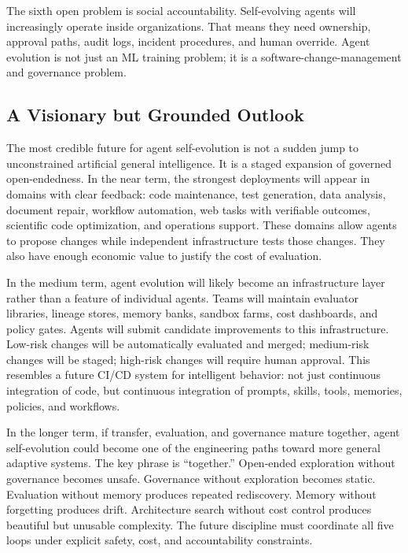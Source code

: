 The sixth open problem is social accountability. Self-evolving agents will increasingly operate inside organizations. That means they need ownership, approval paths, audit logs, incident procedures, and human override. Agent evolution is not just an ML training problem; it is a software-change-management and governance problem.

\subsection{A Visionary but Grounded Outlook}

The most credible future for agent self-evolution is not a sudden jump to unconstrained artificial general intelligence. It is a staged expansion of governed open-endedness. In the near term, the strongest deployments will appear in domains with clear feedback: code maintenance, test generation, data analysis, document repair, workflow automation, web tasks with verifiable outcomes, scientific code optimization, and operations support. These domains allow agents to propose changes while independent infrastructure tests those changes. They also have enough economic value to justify the cost of evaluation.

In the medium term, agent evolution will likely become an infrastructure layer rather than a feature of individual agents. Teams will maintain evaluator libraries, lineage stores, memory banks, sandbox farms, cost dashboards, and policy gates. Agents will submit candidate improvements to this infrastructure. Low-risk changes will be automatically evaluated and merged; medium-risk changes will be staged; high-risk changes will require human approval. This resembles a future CI/CD system for intelligent behavior: not just continuous integration of code, but continuous integration of prompts, skills, tools, memories, policies, and workflows.

In the longer term, if transfer, evaluation, and governance mature together, agent self-evolution could become one of the engineering paths toward more general adaptive systems. The key phrase is ``together.'' Open-ended exploration without governance becomes unsafe. Governance without exploration becomes static. Evaluation without memory produces repeated rediscovery. Memory without forgetting produces drift. Architecture search without cost control produces beautiful but unusable complexity. The future discipline must coordinate all five loops under explicit safety, cost, and accountability constraints.

